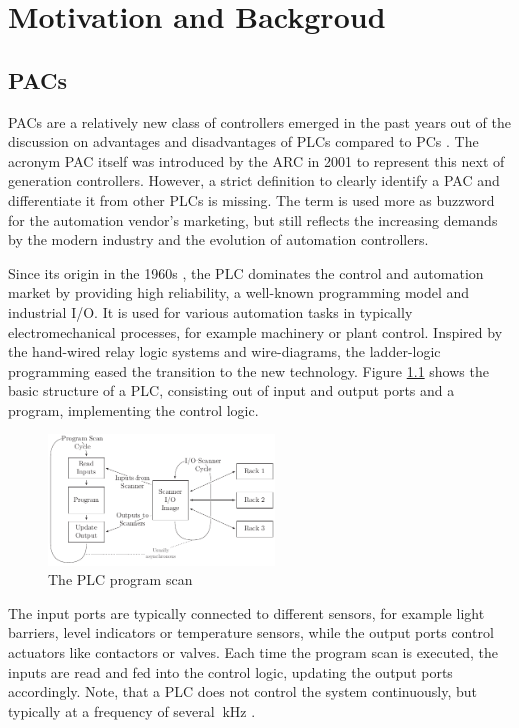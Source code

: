 \chapter{Motivation and Backgroud}
\label{chap:motivation}

\section{\aclp{PAC}}
\aclp{PAC} are a relatively new class of controllers emerged in the past years
out of the discussion on advantages and disadvantages of \acp{PLC} compared to
\acp{PC} \citep{bel05}. The acronym \ac{PAC} itself was introduced by the
\ac{ARC} in 2001 \citep{pay13} to represent this next of generation
controllers. However, a strict definition to clearly identify a \ac{PAC} and
differentiate it from other \acp{PLC} is missing. The term is used more as
buzzword for the automation vendor's marketing, but still reflects the
increasing demands by the modern industry and the evolution of automation
controllers.

Since its origin in the 1960s \citep{par99}, the \ac{PLC} dominates the
control and automation market by providing high reliability, a well-known
programming model and industrial I/O. It is used for various automation tasks
in typically electromechanical processes, for example machinery or plant
control. Inspired by the hand-wired relay logic systems and wire-diagrams, the
ladder-logic programming eased the transition to the new technology. Figure
\ref{fig:plc} shows the basic structure of a \ac{PLC}, consisting out of input
and output ports and a program, implementing the control logic.
\begin{figure}[tb]
	\centering
	\includegraphics[width=6cm]{../figures/plc}
	\caption{The \acs{PLC} program scan \citep[adapted from][]{par99}}
	\label{fig:plc}
\end{figure}
The input ports are typically connected to different sensors, for example
light barriers, level indicators or temperature sensors, while the output
ports control actuators like contactors or valves. Each time the program scan
is executed, the inputs are read and fed into the control logic, updating the
output ports accordingly. Note, that a \ac{PLC} does not control the system
continuously, but typically at a frequency of several $\SI{}{\kilo\hertz}$
\citep{par99}.

